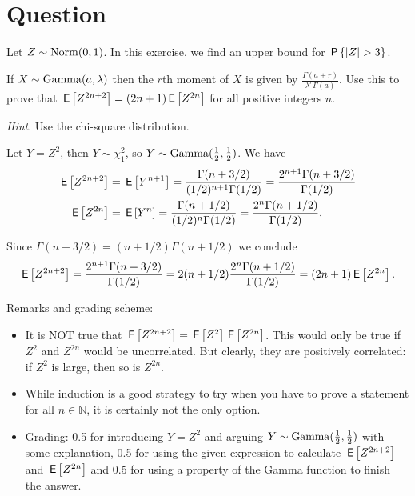 \section{Question}

Let $Z \sim \Norm{0,1}$. 
In this exercise, we find an upper bound for $\P{|Z| > 3}$.

\begin{exercise}[1.5]
If $X \sim \Gamm{a, \lambda}$ then the $r$th moment of $X$ is given by $\frac{\Gamma(a+r)}{\lambda^r\Gamma(a)}$. 
Use this to prove that  $\E{Z^{2n+2}} = (2n+1)\E{Z^{2n}}$ for all positive integers $n$.

\textit{Hint}. Use the chi-square distribution. \\
\begin{solution}
Let $Y = Z^2$, then  $Y \sim \chi^2_1$, so $Y  \sim \Gamm{\tfrac12, \tfrac12}$. We have 
\begin{align*} \E{Z^{2n+2}} &= \E{Y^{n+1}} =  \frac{\Gamma(n+3/2)}{(1/2)^{n+1}\Gamma(1/2)} = \frac{2^{n+1}\Gamma(n+3/2)}{\Gamma(1/2)} \\ 
  \E{Z^{2n}} &= \E{Y^n}  =  \frac{\Gamma(n+1/2)}{(1/2)^n\Gamma(1/2)} = \frac{2^n\Gamma(n+1/2)}{\Gamma(1/2)}. \end{align*}

Since $\Gamma(n+3/2) = (n+1/2) \Gamma(n+1/2)$ we conclude $$\E{Z^{2n+2}} =  \frac{2^{n+1}\Gamma(n+3/2)}{\Gamma(1/2)} = 2(n+1/2)\frac{2^n\Gamma(n+1/2)}{\Gamma(1/2)} = (2n+1)\E{Z^{2n}}.$$  

\noindent Remarks and grading scheme:

\begin{itemize}
\item It is NOT true that $\E{Z^{2n+2}} = \E{Z^{2}}\E{Z^{2n}}$. This would only be true if $Z^2$ and $Z^{2n}$ would be uncorrelated. But clearly, they are positively correlated: if $Z^2$ is large, then so is $Z^{2n}$.
\item While induction is a good strategy to try when you have to prove a statement for all $n \in \mathbb N$, it is certainly not the only option. 
\item Grading: 0.5 for introducing $Y = Z^2$ and arguing $Y  \sim \Gamm{\tfrac12, \tfrac12}$ with some explanation, 0.5 for using the given expression to calculate  $\E{Z^{2n+2}}$ and $\E{Z^{2n}}$ and 0.5 for using a property of the Gamma function to finish the answer. 
\end{itemize}
\end{solution}
\end{exercise}

